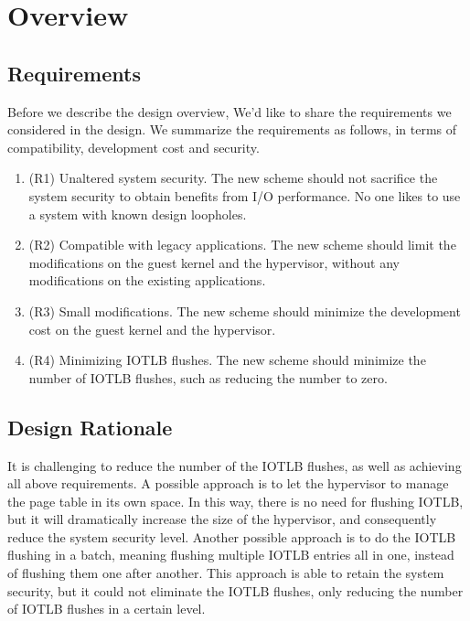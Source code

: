 \section{\name Overview} \label{sec:overview}
\subsection{Requirements}\label{sec:req}
Before we describe the design overview, We'd like to share the requirements we considered in the design.
We summarize the requirements as follows, in terms of compatibility, development cost and security.
\begin{enumerate}
\item (R1) Unaltered system security. The new scheme should not sacrifice the system security to obtain benefits from I/O performance. No one likes to use a system with known design loopholes.
\item (R2) Compatible with legacy applications. The new scheme should limit the modifications on the guest kernel and the hypervisor, without any modifications on the existing applications.
\item (R3) Small modifications. The new scheme should minimize the development cost on the guest kernel and the hypervisor.
\item (R4) Minimizing IOTLB flushes. The new scheme should minimize the number of IOTLB flushes, such as reducing the number to zero.
\end{enumerate}

\subsection{Design Rationale}\label{sec:rationale}
It is challenging to reduce the number of the IOTLB
flushes, as well as achieving all above requirements.
A possible approach is to let the hypervisor to manage the page table in its own space. 
In this way, there is no need for flushing IOTLB, but it will dramatically increase the size of the hypervisor, and consequently reduce the system security level.
Another possible approach is to do the IOTLB flushing in a batch, meaning flushing multiple IOTLB entries all in one, instead of flushing them one after another.
This approach is able to retain the system security, but it could not eliminate the IOTLB flushes, only reducing the number of IOTLB flushes in a certain level.

